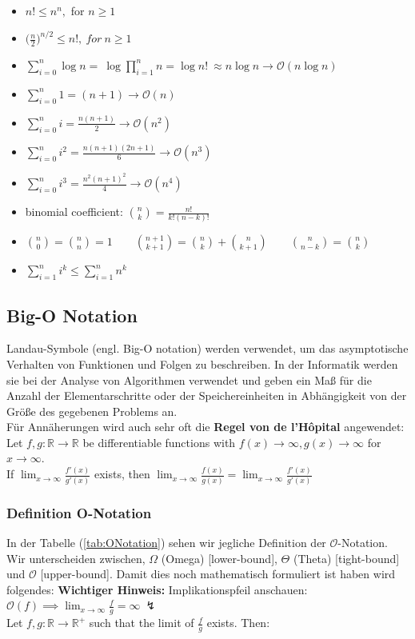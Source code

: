 \documentclass[a4paper]{article}
\begin{document}
    \begin{itemize}
        \item  $n! \leq n^n, $ for $  n\geq 1 $
        \item $\big(\frac{n}{2}\big)^{{n}/{2}} \leq n!, \ for\ n\geq 1 $
        \item $ \sum_{i=0}^{n} \log n  = \ \log\prod_{i=1}^{n}n = \log{n!} \ \approx n\log n \to\mathcal{O}(n \log n)$
        \item $\sum_{i=0}^{n} 1 = (n+1)  \to \mathcal{O}(n)$
        \item $\sum_{i=0}^{n} i = \frac{n(n+1)}{2} \to \mathcal{O}(n^2)$
        \item $\sum_{i=0}^{n} i^2 = \frac{n(n+1)(2n+1)}{6} \to \mathcal{O}(n^3)$
        \item $\sum_{i=0}^{n} i^3 = \frac{n^2(n+1)^2}{4}  \to\mathcal{O}(n^4)$
        \item binomial coefficient: $\binom{n}{k}= \frac{n!}{k!(n-k)!}$
        \item $\binom{n}{0}=\binom{n}{n}=1  \quad\quad
              \binom{n+1}{k+1}=\binom{n}{k}+\binom{n}{k+1}  \quad\quad
              \binom{n}{n-k}=\binom{n}{k}$
        \item $\sum_{i=1}^{n}i^k \leq \sum_{i=1}^{n}n^k$
    \end{itemize}
        

    \subsection{Big-O Notation}
    Landau-Symbole (engl. Big-O notation) werden verwendet, um das asymptotische Verhalten von Funktionen und Folgen zu beschreiben.
    In der Informatik werden sie bei der Analyse von Algorithmen verwendet und geben ein Maß für die Anzahl der Elementarschritte oder der Speichereinheiten in Abhängigkeit von der Größe des gegebenen Problems an. \\
    Für Annäherungen wird auch sehr oft die \textbf{Regel von de l'Hôpital} \label{Hôpital} angewendet:\\
        Let $f, g : \mathbb{R}\to\mathbb{R}$ be differentiable functions with $f(x)\to\infty, g(x)\to\infty$ for $x\to\infty$. \\
        If $\lim_{x\to\infty}\frac{f'(x)}{g'(x)}$ exists, then
        $\lim_{x\to\infty}\frac{f(x)}{g(x)}=\lim_{x\to\infty}\frac{f'(x)}{g'(x)}$


    \subsubsection{Definition O-Notation}
    In der Tabelle (\ref{tab:ONotation}) sehen wir jegliche Definition der $\mathcal{O}$-Notation.
    Wir unterscheiden zwischen, $\Omega$ (Omega) [lower-bound], $\Theta$ (Theta) [tight-bound] und  $\mathcal{O}$ [upper-bound]. Damit dies noch mathematisch formuliert ist haben wird folgendes:   \textbf{Wichtiger Hinweis:} Implikationspfeil anschauen: $\mathcal{O}(f) \implies \lim_{x\to\infty}\frac fg = \infty \ \lightning$ \\
    Let $f, g: \mathbb{R} \rightarrow \mathbb{R}^+$ such that the limit of $\frac f g$ exists. Then:
    
\end{document}
